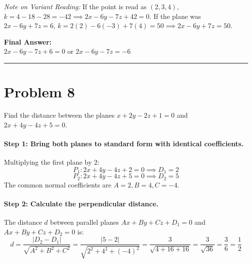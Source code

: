 \documentclass[11pt,a4paper]{article}
\begin{document}
\textit{Note on Variant Reading:} If the point is read as $(2, 3, 4)$, $k = 4 - 18 - 28 = -42 \implies 2x - 6y - 7z + 42 = 0$. If the plane was $2x - 6y + 7z = 6$, $k = 2(2) - 6(-3) + 7(4) = 50 \implies 2x - 6y + 7z = 50$.

\begin{resultbox}
\textbf{Final Answer:}\\
$\boxed{2x - 6y - 7z + 6 = 0}$ \quad or \quad $\boxed{2x - 6y - 7z = -6}$
\end{resultbox}

\vspace{0.4cm}
\hrule
\vspace{0.4cm}

\section{Problem 8}
\begin{problembox}[Problem 8]
Find the distance between the planes $x + 2y - 2z + 1 = 0$ and $2x + 4y - 4z + 5 = 0$.
\end{problembox}

\paragraph{Step 1: Bring both planes to standard form with identical coefficients.}
Multiplying the first plane by $2$:
$$P_1: 2x + 4y - 4z + 2 = 0 \implies D_1 = 2$$
$$P_2: 2x + 4y - 4z + 5 = 0 \implies D_2 = 5$$
The common normal coefficients are $A = 2, B = 4, C = -4$.

\paragraph{Step 2: Calculate the perpendicular distance.}
The distance $d$ between parallel planes $Ax + By + Cz + D_1 = 0$ and $Ax + By + Cz + D_2 = 0$ is:
$$d = \frac{|D_2 - D_1|}{\sqrt{A^2 + B^2 + C^2}} = \frac{|5 - 2|}{\sqrt{2^2 + 4^2 + (-4)^2}} = \frac{3}{\sqrt{4 + 16 + 16}} = \frac{3}{\sqrt{36}} = \frac{3}{6} = \frac{1}{2}$$

\begin{center}
\end{center}
\end{document}
